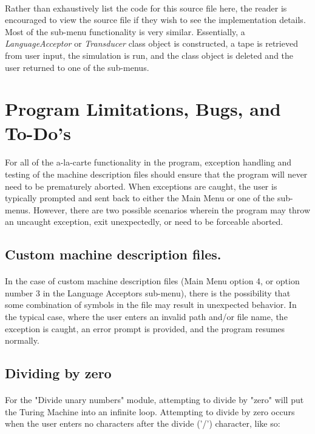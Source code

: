 \documentclass[12pt]{article}
\begin{document}
\paragraph{}
Rather than exhaustively list the code for this source file here, the reader is 
encouraged to view the source file if they wish to see the implementation 
details.  Most of the sub-menu functionality is very similar.  Essentially, a 
\textit{LanguageAcceptor} or \textit{Transducer} class object is constructed, 
a tape is retrieved from user input, the simulation is run, and the class 
object is deleted and the user returned to one of the sub-menus.

\section{Program Limitations, Bugs, and To-Do's}
\paragraph{}
For all of the a-la-carte functionality in the program, exception handling and 
testing of the machine description files should ensure that the program will 
never need to be prematurely aborted.  When exceptions are caught, the user is 
typically prompted and sent back to either the Main Menu or one of the sub-menus.  
However, there are two possible scenarios wherein the program may throw an 
uncaught exception, exit unexpectedly, or need to be forceable aborted.

\subsection{Custom machine description files.}
\paragraph{}
In the case of custom machine description files (Main Menu option 4, or option 
number 3 in the Language Acceptors sub-menu), there is the possibility that 
some combination of symbols in the file may result in unexpected behavior.  In 
the typical case, where the user enters an invalid path and/or file name, the 
exception is caught, an error prompt is provided, and the program resumes 
normally.

\subsection{Dividing by zero}
\paragraph{}
For the "Divide unary numbers" module, attempting to divide by "zero" will 
put the Turing Machine into an infinite loop.  Attempting to divide by zero 
occurs when the user enters no characters after the divide ('/') character, 
like so:
\end{document}
